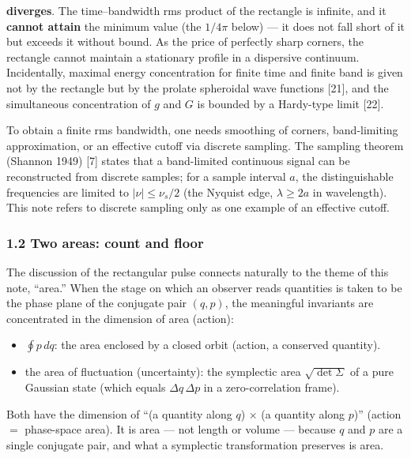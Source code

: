 \documentclass[
]{article}
\providecommand{\tightlist}{%
  \setlength{\itemsep}{0pt}\setlength{\parskip}{0pt}}
\begin{document}
\textbf{diverges}. The time--bandwidth rms product of the rectangle is
infinite, and it \textbf{cannot attain} the minimum value (the
\(1/4\pi\) below) --- it does not fall short of it but exceeds it
without bound. As the price of perfectly sharp corners, the rectangle
cannot maintain a stationary profile in a dispersive continuum.
Incidentally, maximal energy concentration for finite time and finite
band is given not by the rectangle but by the prolate spheroidal wave
functions {[}21{]}, and the simultaneous concentration of \(g\) and
\(G\) is bounded by a Hardy-type limit {[}22{]}.

To obtain a finite rms bandwidth, one needs smoothing of corners,
band-limiting approximation, or an effective cutoff via discrete
sampling. The sampling theorem (Shannon 1949) {[}7{]} states that a
band-limited continuous signal can be reconstructed from discrete
samples; for a sample interval \(a\), the distinguishable frequencies
are limited to \(|\nu|\le\nu_s/2\) (the Nyquist edge, \(\lambda\ge 2a\)
in wavelength). This note refers to discrete sampling only as one
example of an effective cutoff.

\subsubsection{1.2 Two areas: count and
floor}\label{two-areas-count-and-floor}

The discussion of the rectangular pulse connects naturally to the theme
of this note, ``area.'' When the stage on which an observer reads
quantities is taken to be the phase plane of the conjugate pair
\((q,p)\), the meaningful invariants are concentrated in the dimension
of area (action):

\begin{itemize}
\tightlist
\item
  \(\oint p\,dq\): the area enclosed by a closed orbit (action, a
  conserved quantity).
\item
  the area of fluctuation (uncertainty): the symplectic area
  \(\sqrt{\det\Sigma}\) of a pure Gaussian state (which equals
  \(\Delta q\,\Delta p\) in a zero-correlation frame).
\end{itemize}

Both have the dimension of ``(a quantity along \(q\)) \(\times\) (a
quantity along \(p\))'' (action \(=\) phase-space area). It is area ---
not length or volume --- because \(q\) and \(p\) are a single conjugate
pair, and what a symplectic transformation preserves is area.
\end{document}
